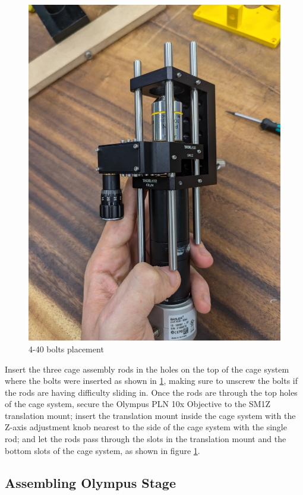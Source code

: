 \documentclass[runningheads]{llncs}
\begin{document}
\begin{figure}
\begin{minipage}[b]{0.4\textwidth}
        \includegraphics[width=\textwidth]{images/4-40placement.jpg} 
        \caption{4-40 bolts placement}
        \label{fig:4-40placements}
    \end{minipage}
\end{figure}

Insert the three cage assembly rods in the holes on the top of the cage system where the bolts were inserted as shown in \ref{fig:4-40placements}, making sure to unscrew the bolts if the rods are having difficulty sliding in. Once the rods are through the top holes of the cage system, secure the Olympus PLN 10x Objective to the SM1Z translation mount; insert the translation mount inside the cage system with the Z-axis adjustment knob nearest to the side of the cage system with the single rod; and let the rods pass through the slots in the translation mount and the bottom slots of the cage system, as shown in figure \ref{fig:4-40placements}. 

\subsection*{Assembling Olympus Stage}
\end{document}
